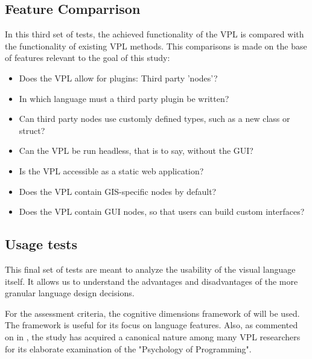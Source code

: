 

\subsection{Feature Comparrison}
\label{sec:method:tests:features}

In this third set of tests, the achieved functionality of the VPL is compared with the functionality of existing VPL methods. 
This comparisons is made on the base of features relevant to the goal of this study:
\begin{itemize}[-]
  \item Does the VPL allow for plugins: Third party 'nodes'?  
  \item In which language must a third party plugin be written?
  \item Can third party nodes use customly defined types, such as a new class or struct?
  \item Can the VPL be run headless, that is to say, without the \ac{GUI}?
  \item Is the VPL accessible as a static web application?
  \item Does the VPL contain GIS-specific nodes by default?
  \item Does the VPL contain \ac{GUI} nodes, so that users can build custom interfaces?
\end{itemize}

\subsection{Usage tests}


This final set of tests are meant to analyze the usability of the visual language itself. 
It allows us to understand the advantages and disadvantages of the more granular language design decisions.

For the assessment criteria, the cognitive dimensions framework of \citet{green_usability_1996} will be used. 
The framework is useful for its focus on language features. 
Also, as commented on in , the study has acquired a canonical nature among many VPL researchers for its elaborate examination of the "Psychology of Programming".

